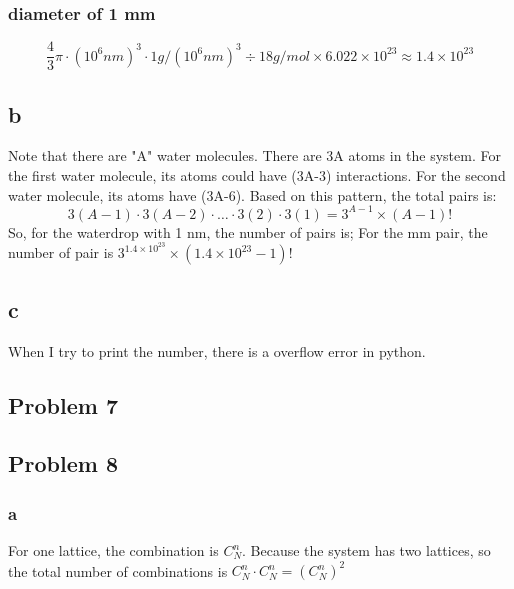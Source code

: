 \documentclass[a4paper]{article}
\begin{document}
\subsubsection{diameter of 1 mm}
\begin{equation}
	\frac{4}{3}\pi \cdot (10^{6} nm)^{3} \cdot 1g/(10^{6}nm)^{3} \div 18 g/mol \times 6.022 \times 10^{23} \approx 1.4 \times 10^{23}
\end{equation}

\subsection{b}
Note that there are "A" water molecules. There are 3A atoms in the system. For the first water molecule, its atoms could have (3A-3) interactions. For the second water molecule, its atoms have (3A-6). Based on this pattern, the total pairs is:
\begin{equation}
	3(A-1) \cdot 3(A-2) \cdot \dots \cdot 3(2) \cdot 3(1)=3^{A-1} \times (A-1)!
\end{equation}
So, for the waterdrop with 1 nm, the number of pairs is; For the mm pair, the number of pair is $3^{1.4 \times 10^{23}} \times (1.4 \times 10^{23}-1)!$

\subsection{c}
When I try to print the number, there is a overflow error in python.

\subsection{Problem 7}

\subsection{Problem 8}
\subsubsection{a}
For one lattice, the combination is $C_{N}^{n}$. Because the system has two lattices, so the total number of combinations is $C_{N}^{n} \cdot C_{N}^{n} = (C_{N}^{n})^2$
\end{document}
